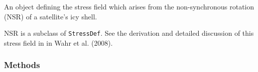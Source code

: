 An object defining the stress field which arises from the non-synchronous 
rotation (NSR) of a satellite's icy shell.

NSR is a subclass of \texttt{StressDef}.  See the derivation and detailed 
discussion of this stress field in in Wahr et al. (2008).



  \subsubsection{Methods}

    \vspace{0.5ex}

